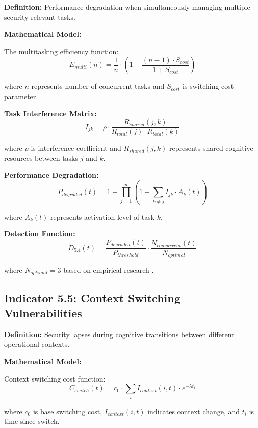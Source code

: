 \documentclass[11pt,a4paper]{article}
\begin{document}
\textbf{Definition:} Performance degradation when simultaneously managing multiple security-relevant tasks.

\textbf{Mathematical Model:}

The multitasking efficiency function:
\begin{equation}
E_{multi}(n) = \frac{1}{n} \cdot \left(1 - \frac{(n-1) \cdot S_{cost}}{1 + S_{cost}}\right)
\end{equation}

where $n$ represents number of concurrent tasks and $S_{cost}$ is switching cost parameter.

\textbf{Task Interference Matrix:}
\begin{equation}
I_{jk} = \rho \cdot \frac{R_{shared}(j,k)}{R_{total}(j) \cdot R_{total}(k)}
\end{equation}

where $\rho$ is interference coefficient and $R_{shared}(j,k)$ represents shared cognitive resources between tasks $j$ and $k$.

\textbf{Performance Degradation:}
\begin{equation}
P_{degraded}(t) = 1 - \prod_{j=1}^{n} \left(1 - \sum_{k \neq j} I_{jk} \cdot A_k(t)\right)
\end{equation}

where $A_k(t)$ represents activation level of task $k$.

\textbf{Detection Function:}
\begin{equation}
D_{5.4}(t) = \frac{P_{degraded}(t)}{P_{threshold}} \cdot \frac{N_{concurrent}(t)}{N_{optimal}}
\end{equation}

where $N_{optimal} = 3$ based on empirical research \cite{rubinstein2001}.

\subsection{Indicator 5.5: Context Switching Vulnerabilities}

\textbf{Definition:} Security lapses during cognitive transitions between different operational contexts.

\textbf{Mathematical Model:}

Context switching cost function:
\begin{equation}
C_{switch}(t) = c_0 \cdot \sum_{i} I_{context}(i,t) \cdot e^{-\lambda t_i}
\end{equation}

where $c_0$ is base switching cost, $I_{context}(i,t)$ indicates context change, and $t_i$ is time since switch.
\end{document}
